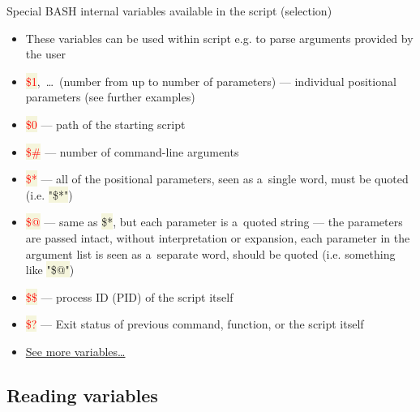 \documentclass[compress, xelatex, 11pt, xcolor=svgnames, aspectratio=169,
	hyperref={
		bookmarks=true,
		unicode=true,
		colorlinks=true,
		pdftitle={Linux, command line and MetaCentrum},
		plainpages=false,
		pdfauthor={Vojtech Zeisek},
		pdfsubject={Course about use of Linux command line, writing shell scripts and using MetaCentrum of CESNET},
		pdfcreator={XeLaTeX},
		pdfkeywords={Linux, GNU, BASH, shell, command line, MetaCentrum},
		linkcolor=DarkRed, %
		anchorcolor=DarkBlue, %
		citecolor=Indigo, %
		filecolor=NavyBlue, %
		menucolor=DarkMagenta, %
		urlcolor=DarkBlue, %
		},
	url={hyphens, lowtilde} %
	]{beamer}
\renewcommand{\texttt}[1]{\colorbox{Beige}{{\ttfamily #1}}}
\renewcommand{\alert}[1]{\textcolor{red}{#1}}
\begin{document}
\begin{frame}{Special BASH internal variables available in the script (selection)}
	\begin{itemize}
		\item These variables can be used within script e.g. to parse arguments provided by the user
		\item \alert{\texttt{\$1}},~\ldots~(number from \texttt{1} up to number of parameters) --- individual positional parameters (see further examples)
		\item \alert{\texttt{\$0}} --- path of the starting script
		\item \alert{\texttt{\$\#}} --- number of command-line arguments
		\item \alert{\texttt{\$*}} --- all of the positional parameters, seen as a~single word, must be quoted (i.e. \texttt{"\$*"})
		\item \alert{\texttt{\$@}} --- same as \texttt{\$*}, but each parameter is a~quoted string --- the parameters are passed intact, without interpretation or expansion, each parameter in the argument list is seen as a~separate word, should be quoted (i.e. something like \texttt{"\$@"})
		\item \alert{\texttt{\$\$}} --- process ID (PID) of the script itself
		\item \alert{\texttt{\$?}} --- Exit status of previous command, function, or the script itself
		\item \href{https://tldp.org/LDP/abs/html/internalvariables.html}{See more variables\ldots}
	\end{itemize}
\end{frame}

\subsection{Reading variables}
\end{document}
